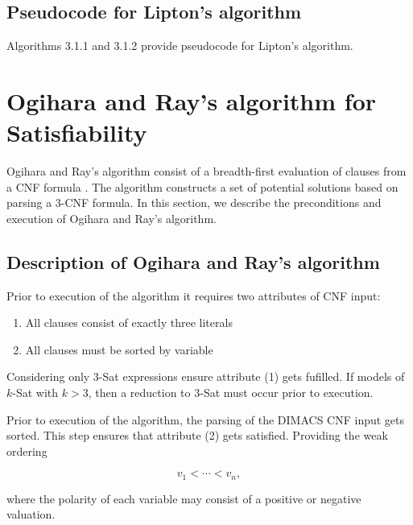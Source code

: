 	\subsection{Pseudocode for Lipton's algorithm}
	
Algorithms 3.1.1 and 3.1.2 provide pseudocode for Lipton's algorithm.  
	
	

	
\section{Ogihara and Ray's algorithm for {\sc Satisfiability}}


Ogihara and Ray's algorithm consist of a breadth-first evaluation of clauses from a CNF formula \cite{Ogihara:1996:BFS:898228,Ogihara97dna-basedparallel}.  The algorithm constructs a set of potential solutions based on parsing a 3-CNF formula.  In this section, we describe the preconditions and execution of Ogihara and Ray's algorithm.

\subsection{Description of Ogihara and Ray's algorithm}
		
Prior to execution of the algorithm it requires two attributes of CNF input:

\begin{enumerate}
\item All clauses consist of exactly three literals
\item All clauses must be sorted by variable
\end{enumerate}

Considering only $3$-{\sc Sat} expressions ensure attribute (1) gets fufilled.  If models of $k$-{\sc Sat} with $k > 3$, then a reduction to $3$-{\sc Sat} must occur prior to execution.

Prior to execution of the algorithm, the parsing of the DIMACS CNF input gets sorted.  This step ensures that attribute (2) gets satisfied.  Providing the weak ordering

\[
v_1 < \cdots < v_n,
\]

where the polarity of each variable may consist of a positive or negative valuation.


